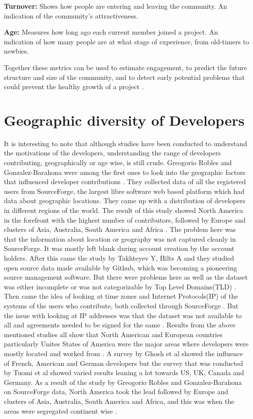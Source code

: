 \documentclass[seploa]{beavtex}
\begin{document}
\textbf{Turnover:}
Shows how people are entering and leaving the community. An indication of the community's attractiveness.

\textbf{Age:}
Measures how long ago each current member joined a project. An indication of how many people are at what stage of experience, from old-timers to newbies.


Together these metrics can be used to estimate engagement, to predict the future structure and size of the community, and to detect early potential problems that could prevent the healthy growth of a project \cite{jes2014}.

\section{Geographic diversity of Developers}
It is interesting to note that although studies have been conducted to understand the motivations of the developers, understanding the range of developers contributing, geographically or age wise, is still crude. Greogorio Robles and Gonzalez-Barahona were among the first ones to look into the geographic factors that influenced developer contributions \cite{kishida2003}. They collected data of all the registered users from SourceForge, the largest libre software web based platform which had data about geographic locations. They came up with a distribution of developers in different regions of the world. The result of this study showed North America in the forefront with the highest number of contributors, followed by Europe and clusters of Asia, Australia, South America and Africa \cite{robles2006}. The problem here was that the information about location or geography was not captured cleanly in SourceForge. It was mostly left blank during account creation by the account holders.  
 After this came the study by Takhteyev Y, Hilts A and they studied open source data made available by Github, which was becoming a pioneering source management software. But there were problems here as well as the dataset was either incomplete or was not categorizable by Top Level Domains(TLD) \cite{yuri2010}. Then came the idea of looking at time zones and Internet Protocols(IP) of the systems of the users who contribute, both collected through SourceForge \cite{von2010}. But the issue with looking at IP addresses was that the dataset was not available to all and agreements needed to be signed for the same \cite{von2010}. Results from the above mentioned studies all show that North American and European countries particularly Unites States of America were the major areas where developers were mostly located and worked from \cite{yuri2010, von2010}. A survey by Ghosh et al \cite{ghosh2005} showed the influence of French, American and German developers but the survey that was conducted by Tuomi et al \cite{tuomi2004} showed varied results leaning a lot towards US, UK, Canada and Germany. As a result of the study by Greogorio Robles and Gonzalez-Barahona on SourceForge data, North America took the lead followed by Europe and clusters of Asia, Australia, South America and Africa, and this was when the areas were segregated continent wise \cite{robles2006}.
\end{document}
